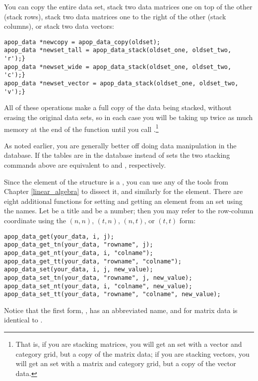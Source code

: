You can copy the entire data set, 
stack two data matrices one on top of the other (stack rows), 
stack two data matrices one to the right of the other (stack columns),
or stack two data vectors:
\begin{lstlisting}
apop_data *newcopy = apop_data_copy(oldset);
apop_data *newset_tall = apop_data_stack(oldset_one, oldset_two, 'r');}
apop_data *newset_wide = apop_data_stack(oldset_one, oldset_two, 'c');}
apop_data *newset_vector = apop_data_stack(oldset_one, oldset_two, 'v');}
\end{lstlisting}

All of these operations make a full copy of the data being stacked, without
erasing the original data sets, so in each case
you will be taking up twice as much memory
at the end of the function until you call
.\footnote{That is, 
if you are stacking matrices, you will get an  set with a
 vector and category grid, but a copy of the matrix data; 
if you are stacking vectors, you will get an  set with a
 matrix and category grid, but a copy of the vector 
data.} 

As
noted earlier, you are generally better off doing data manipulation
in the database. If the tables are in the database instead of
 sets the two stacking commands above are equivalent
to 
and ,
respectively.

Since the  element of the  structure
is a , you can use any of the tools from Chapter
\ref{linear_algebra} to dissect it, and similarly for the
 element.
There are eight additional functions for setting and getting an element from an
 set using the names. Let  be a title and
 be a number; then you may refer to the row-column coordinate
using the $(n,n)$, $(t,n)$, $(n,t)$, or $(t,t)$ form:
\begin{lstlisting}
apop_data_get(your_data, i, j);
apop_data_get_tn(your_data, "rowname", j);
apop_data_get_nt(your_data, i, "colname");
apop_data_get_tt(your_data, "rowname", "colname");
apop_data_set(your_data, i, j, new_value);
apop_data_set_tn(your_data, "rowname", j, new_value);
apop_data_set_nt(your_data, i, "colname", new_value);
apop_data_set_tt(your_data, "rowname", "colname", new_value);
\end{lstlisting}
Notice that the first form, ,
has an abbreviated name, and for matrix data is identical to
. 

